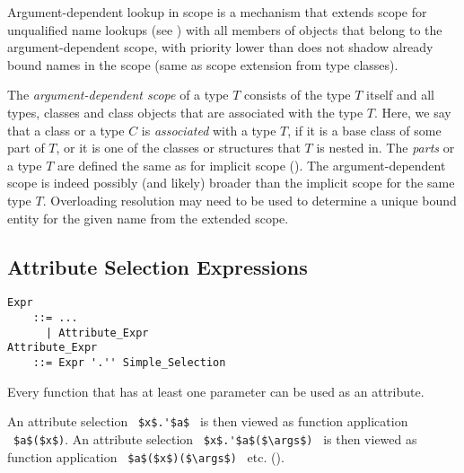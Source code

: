 Argument-dependent lookup in scope is a mechanism that extends scope for unqualified name lookups (see ) with all members of objects that belong to the argument-dependent scope, with priority lower than does not shadow already bound names in the scope (same as scope extension from type classes).  

The {\em argument-dependent scope} of a type $T$ consists of the type $T$ itself and all types, classes and class objects that are associated with the type $T$. Here, we say that a class or a type $C$ is {\em associated} with a type $T$, if it is a base class of some part of $T$, or it is one of the classes or structures that $T$ is nested in. The {\em parts} or a type $T$ are defined the same as for implicit scope (). The argument-dependent scope is indeed possibly (and likely) broader than the implicit scope for the same type $T$. Overloading resolution may need to be used to determine a unique bound entity for the given name from the extended scope. 





\subsection{Attribute Selection Expressions}
\label{sec:attribute-selection}

\grammar\begin{lstlisting}
Expr
    ::= ...
      | Attribute_Expr
Attribute_Expr 
    ::= Expr '.'' Simple_Selection
\end{lstlisting}

Every function that has at least one parameter can be used as an attribute. 

An attribute selection ~\lstinline!$x$.'$a$!~ is then viewed as function application ~\lstinline!$a$($x$)!. An attribute selection ~\lstinline!$x$.'$a$($\args$)!~ is then viewed as function application ~\lstinline!$a$($x$)($\args$)!~ etc. (). 

